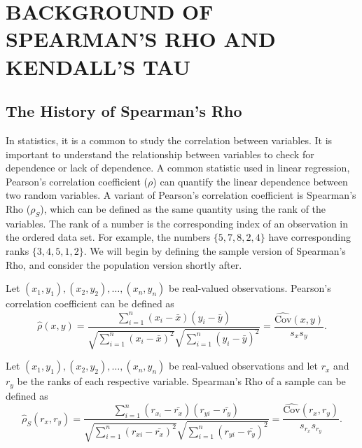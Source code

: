 \chapter{BACKGROUND OF SPEARMAN'S RHO AND KENDALL'S TAU}\label{chap:background}
\section{The History of Spearman's Rho}\label{sec:the_history_of_spearmans_rho}
\hspace{24pt} In statistics, it is a common to study the correlation between variables. It is important to understand the relationship between variables to check for dependence or lack of dependence. A common statistic used in linear regression, Pearson's correlation coefficient ($\rho$) can quantify the linear dependence between two random variables. A variant of Pearson's correlation coefficient is Spearman's Rho ($\rho_S$), which can be defined as the same quantity using the rank of the variables. The rank of a number is the corresponding index of an observation in the ordered data set. For example, the numbers $\{5,7,8,2,4\}$ have corresponding ranks $\{3,4,5,1,2\}$. We will begin by defining the sample version of Spearman's Rho, and consider the population version shortly after.
\begin{definition}\label{def:pearson}
    Let $\left(x_1,y_1\right),\left(x_2,y_2\right),\ldots,\left(x_n,y_n\right)$ be real-valued observations. Pearson's correlation coefficient can be defined as $$\widehat{\rho}\left(x,y\right)=\frac{\sum_{i=1}^n\left(x_i-\bar{x}\right)\left(y_i-\bar{y}\right)}{\sqrt{\sum_{i=1}^n\left(x_i-\bar{x}\right)^2}\sqrt{\sum_{i=1}^n\left(y_i-\bar{y}\right)^2}}=\frac{\widehat{\text{Cov}}\left(x,y\right)}{s_{x}s_{y}}.$$
\end{definition}
\begin{definition}\label{def:spearman_sample}
    Let $\left(x_1,y_1\right),\left(x_2,y_2\right),\ldots,\left(x_n,y_n\right)$ be real-valued observations and let $r_x$ and $r_y$ be the ranks of each respective variable. Spearman's Rho of a sample can be defined as $$\widehat{\rho}_S\left(r_x,r_y\right)=\frac{\sum_{i=1}^n\left(r_{x_i}-\bar{r_x}\right)\left(r_{yi}-\bar{r_y}\right)}{\sqrt{\sum_{i=1}^n\left(r_{xi}-\bar{r_x}\right)^2}\sqrt{\sum_{i=1}^n\left(r_{yi}-\bar{r_y}\right)^2}}=\frac{\widehat{\text{Cov}}\left(r_x,r_y\right)}{s_{r_x}s_{r_y}}.$$
\end{definition}
